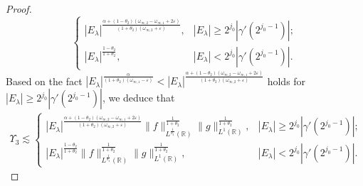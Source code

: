 \documentclass[11pt, twoside, leqno]{article}
\theoremstyle{definition}
\numberwithin{equation}{section}
\begin{document}
\begin{proof}
$$\begin{cases}
  |E_\lambda|^{\frac{\alpha+(1-\theta_2)(\omega_{\infty,2}-\omega_{\infty,1}+2\varepsilon)}{(1+\theta_{2})(\omega_{\infty,2}+\varepsilon)}}, & |E_\lambda|\geq2^{j_0}|\gamma'(2^{j_{0}-1})|; \\
  |E_\lambda|^{\frac{1-\theta_{2}}{1+\theta_{2}}}, & |E_\lambda|<2^{j_0}|\gamma'(2^{j_{0}-1})|.
\end{cases}$$
Based on the fact $|E_\lambda|^{\frac{\alpha}{(1+\theta_{2})(\omega_{\infty,1}-\varepsilon)}}< |E_\lambda|^{\frac{\alpha+(1-\theta_{2})(\omega_{\infty,2}-\omega_{\infty,1}+2\varepsilon)}{(1+\theta_{2})(\omega_{\infty,2}+\varepsilon)}}$ holds for $|E_\lambda|\geq2^{j_0}|\gamma'(2^{j_{0}-1})|$, we deduce that
\begin{align}\label{eq:5.11}
\Upsilon_{3}\lesssim
\begin{cases}
  |E_\lambda|^{\frac{\alpha+(1-\theta_{2})(\omega_{\infty,2}-\omega_{\infty,1}+2\varepsilon)}{(1+\theta_{2})(\omega_{\infty,2}+\varepsilon)}}\|f\|^{\frac{1}{1+\theta_2}}_{L^{\frac{1}{\theta_2}}(\mathbb{R})}\|g\|^{\frac{1}{1+\theta_2}}_{L^{1}(\mathbb{R})}, & |E_\lambda|\geq2^{j_0}|\gamma'(2^{j_{0}-1})|; \\
  |E_\lambda|^{\frac{1-\theta_{2}}{1+\theta_{2}}}\|f\|^{\frac{1}{1+\theta_2}}_{L^{\frac{1}{\theta_2}}(\mathbb{R})}\|g\|^{\frac{1}{1+\theta_2}}_{L^{1}(\mathbb{R})}, & |E_\lambda|<2^{j_0}|\gamma'(2^{j_{0}-1})|.
\end{cases}
 \end{align}


\end{proof}
\end{document}
